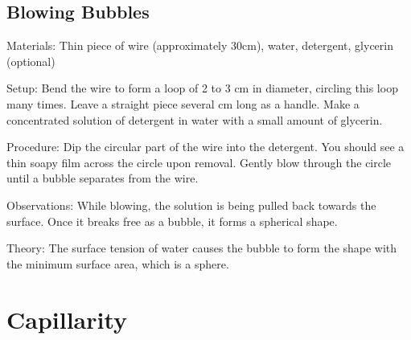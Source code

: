 \begin{multicols}{2}
\subsection{Blowing Bubbles}
\begin{description*}
\item[Materials:]{Thin piece of wire (approximately 30cm), water, detergent, glycerin (optional)}
\item[Setup:]{Bend the wire to form a loop of 2 to 3 cm in diameter, circling this loop many times. Leave a straight piece several cm long as a handle. Make a concentrated solution of detergent in water with a small amount of glycerin.}
\item[Procedure:]{Dip the circular part of the wire into the detergent. You should see a thin soapy film across the circle upon removal. Gently blow through the circle until a bubble separates from the wire.}
\item[Observations:]{While blowing, the solution is being pulled back towards the surface. Once it breaks free as a bubble, it forms a spherical shape.}
\item[Theory:]{The surface tension of water causes the bubble to form the shape with the minimum surface area, which is a sphere.}
\end{description*}


\section*{Capillarity}


\end{multicols}
